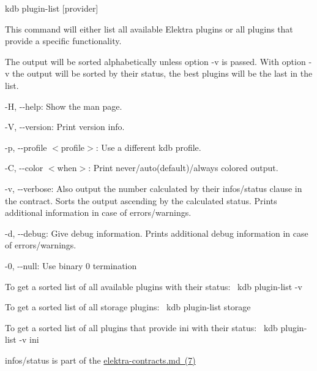{\ttfamily kdb plugin-\/list \mbox{[}provider\mbox{]}}

This command will either list all available Elektra plugins or all plugins that provide a specific functionality.

The output will be sorted alphabetically unless option {\ttfamily -\/v} is passed. With option {\ttfamily -\/v} the output will be sorted by their status, the best plugins will be the last in the list.


\begin{DoxyItemize}
\item {\ttfamily -\/H}, {\ttfamily -\/-\/help}\+: Show the man page.
\item {\ttfamily -\/V}, {\ttfamily -\/-\/version}\+: Print version info.
\item {\ttfamily -\/p}, {\ttfamily -\/-\/profile $<$profile$>$}\+: Use a different kdb profile.
\item {\ttfamily -\/C}, {\ttfamily -\/-\/color $<$when$>$}\+: Print never/auto(default)/always colored output.
\item {\ttfamily -\/v}, {\ttfamily -\/-\/verbose}\+: Also output the number calculated by their {\ttfamily infos/status} clause in the contract. Sorts the output ascending by the calculated status. Prints additional information in case of errors/warnings.
\item {\ttfamily -\/d}, {\ttfamily -\/-\/debug}\+: Give debug information. Prints additional debug information in case of errors/warnings.
\item {\ttfamily -\/0}, {\ttfamily -\/-\/null}\+: Use binary 0 termination
\end{DoxyItemize}

To get a sorted list of all available plugins with their status\+:~\newline
 {\ttfamily kdb plugin-\/list -\/v}

To get a sorted list of all storage plugins\+:~\newline
 {\ttfamily kdb plugin-\/list storage}

To get a sorted list of all plugins that provide {\ttfamily ini} with their status\+:~\newline
 {\ttfamily kdb plugin-\/list -\/v ini}


\begin{DoxyItemize}
\item {\ttfamily infos/status} is part of the \mbox{\hyperlink{doc_help_elektra-contracts_md}{elektra-\/contracts.md (7)}} 
\end{DoxyItemize}